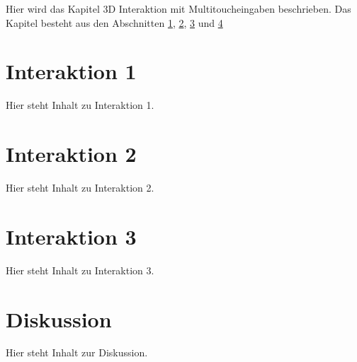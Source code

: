 Hier wird das Kapitel 3D Interaktion mit Multitoucheingaben beschrieben. Das Kapitel besteht aus den Abschnitten \ref{sec:interaktion_1}, \ref{sec:interaktion_2}, \ref{sec:interaktion_3} und \ref{sec:diskussion_interaktion}


\section{Interaktion 1}
\label{sec:interaktion_1}

Hier steht Inhalt zu Interaktion 1.


\section{Interaktion 2}
\label{sec:interaktion_2}

Hier steht Inhalt zu Interaktion 2.


\section{Interaktion 3}
\label{sec:interaktion_3}

Hier steht Inhalt zu Interaktion 3.


\section{Diskussion}
\label{sec:diskussion_interaktion}

Hier steht Inhalt zur Diskussion.